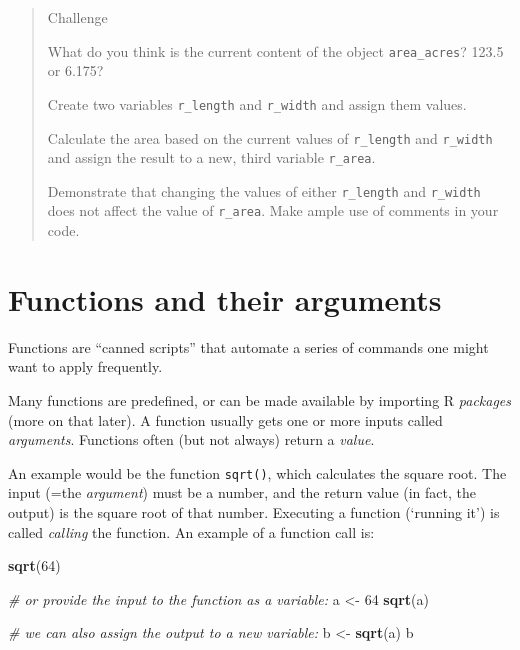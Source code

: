 \documentclass[
]{book}
\newenvironment{Shaded}{\begin{snugshade}}{\end{snugshade}}
\newcommand{\CommentTok}[1]{\textcolor[rgb]{0.56,0.35,0.01}{\textit{#1}}}
\newcommand{\DecValTok}[1]{\textcolor[rgb]{0.00,0.00,0.81}{#1}}
\newcommand{\FunctionTok}[1]{\textcolor[rgb]{0.13,0.29,0.53}{\textbf{#1}}}
\newcommand{\NormalTok}[1]{#1}
\newcommand{\OtherTok}[1]{\textcolor[rgb]{0.56,0.35,0.01}{#1}}
\begin{document}
\begin{quote}
Challenge

What do you think is the current content of the object \texttt{area\_acres}? 123.5 or 6.175?

Create two variables \texttt{r\_length} and \texttt{r\_width} and assign them values.

Calculate the area based on the current values of \texttt{r\_length} and \texttt{r\_width} and assign the result to a new, third variable \texttt{r\_area}.

Demonstrate that changing the values of either \texttt{r\_length} and \texttt{r\_width} does not affect the value of \texttt{r\_area}. Make ample use of comments in your code.
\end{quote}

\section{Functions and their arguments}\label{functions-and-their-arguments}

Functions are ``canned scripts'' that automate a series of commands one might want to apply frequently.

Many functions are predefined, or can be
made available by importing R \emph{packages} (more on that later). A function
usually gets one or more inputs called \emph{arguments}. Functions often (but not
always) return a \emph{value}.

An example would be the function \texttt{sqrt()}, which calculates the square root. The
input (=the \emph{argument}) must be a number, and the return value (in fact, the
output) is the square root of that number. Executing a function (`running it') is called \emph{calling} the function. An example of a function call is:

\begin{Shaded}
\begin{Highlighting}[]
\FunctionTok{sqrt}\NormalTok{(}\DecValTok{64}\NormalTok{)}

\CommentTok{\# or provide the input to the function as a variable:}
\NormalTok{a }\OtherTok{\textless{}{-}} \DecValTok{64}
\FunctionTok{sqrt}\NormalTok{(a)}

\CommentTok{\# we can also assign the output to a new variable:}
\NormalTok{b }\OtherTok{\textless{}{-}} \FunctionTok{sqrt}\NormalTok{(a)}
\NormalTok{b}
\end{Highlighting}
\end{Shaded}
\end{document}
